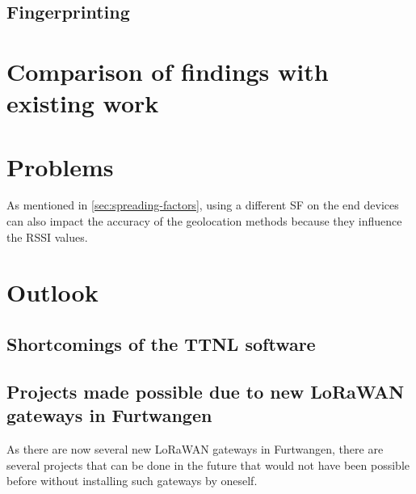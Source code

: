 \subsection{Fingerprinting}



\section{Comparison of findings with existing work}


\section{Problems}


As mentioned in \cref{sec:spreading-factors}, using a different \ac{SF} on the end devices can also impact the accuracy of the geolocation methods because they influence the \ac{RSSI} values.

\section{Outlook}


\subsection{Shortcomings of the \acf{TTNL} software}


\subsection{Projects made possible due to new \acs{LoRaWAN} gateways in Furtwangen}

As there are now several new \ac{LoRaWAN} gateways in Furtwangen, there are several projects that can be done in the future that would not have been possible before without installing such gateways by oneself.

